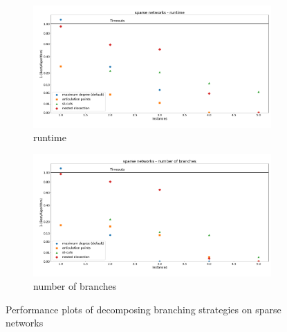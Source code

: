 \documentclass[12pt,a4paper,twoside]{scrartcl}
\numberwithin{equation}{section}
\begin{document}
\begin{figure}[hbt!]
	\begin{subfigure}{1\textwidth}
		\includegraphics[width=\textwidth]{images/plots/a1_sn_t}
		\caption{runtime}
	\end{subfigure}
	\begin{subfigure}{1\textwidth}
		\includegraphics[width=\textwidth]{images/plots/a1_sn_b}
		\caption{number of branches}
	\end{subfigure}
	\caption{Performance plots of decomposing branching strategies on sparse networks}
\end{figure}
\end{document}
